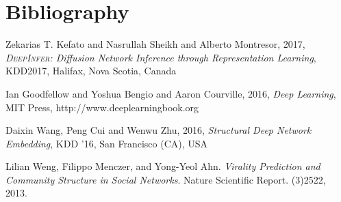 \documentclass{article}
\begin{document}
			
			\newpage
			
	\section{Bibliography}
	\begin{thebibliography}{10}	
		
		Zekarias T. Kefato and Nasrullah Sheikh and Alberto Montresor, 2017, \textit{\textsc{DeepInfer}: Diffusion Network Inference through Representation Learning}, KDD2017, Halifax, Nova Scotia, Canada
		
		Ian Goodfellow and Yoshua Bengio and Aaron Courville, 2016, \textit{Deep Learning}, MIT Press, http://www.deeplearningbook.org
		
		Daixin Wang, Peng Cui and Wenwu Zhu, 2016, \textit{Structural Deep Network Embedding}, KDD ’16, San Francisco (CA), USA
		
		Lilian Weng, Filippo Menczer, and Yong-Yeol Ahn. \textit{Virality Prediction and Community Structure in Social Networks}. Nature Scientific Report. (3)2522, 2013.
		
	\end{thebibliography}
			
\end{document}
